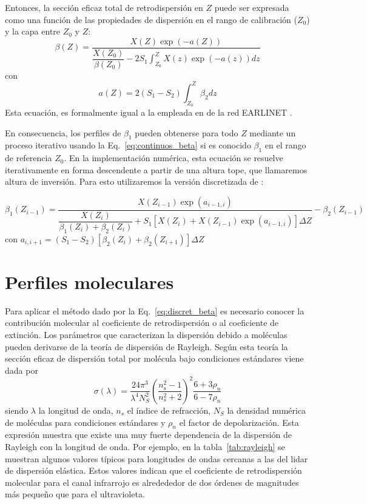 \documentclass[12pt,a4paper,final]{report}
\begin{document}
	Entonces, la sección eficaz total de retrodispersión en $Z$ puede ser expresada como una función de las propiedades de dispersión en el rango de calibración ($Z_0$) y la capa entre $Z_0$ y $Z$:	
	\begin{equation}
	\beta(Z)=\frac{\displaystyle X(Z) \exp(-a(Z))}{\displaystyle \dfrac{X(Z_0)}{\beta(Z_0)}-2S_1 \int_{Z_0}^{Z} X(z)\exp(-a(z))dz}
	\label{eq:continuos_beta}
	\end{equation}
	con 
	\[ a(Z)=2(S_1-S_2)\int_{Z_0}^{Z} \beta_2 dz \]
	Esta ecuación, es formalmente igual a la empleada en de la red EARLINET \citep{bockmann2004}.
	
	En consecuencia, los perfiles de $\beta_1$ pueden obtenerse para todo $Z$ mediante un proceso iterativo  usando la Eq.~\ref{eq:continuos_beta} si es conocido $\beta_1$ en el rango de referencia $Z_0$. En la implementación numérica, esta ecuación se resuelve iterativamente en forma descendente a partir de una altura tope, que llamaremos altura de inversión. Para esto utilizaremos la versión discretizada de \citet{fernald1984}:
	
	\begin{equation}
	\beta_1(Z_{i-1}) = \dfrac
	{X(Z_{i-1}) \exp(a_{i-1,i})}
	{\dfrac{X(Z_{i})}{\beta_1(Z_{i})+\beta_2(Z_{i})}
		+S_1[X(Z_{i})+X(Z_{i-1}) \exp(a_{i-1,i})]\Delta Z}
	-\beta_2(Z_{i-1})
	\label{eq:discret_beta}
	\end{equation}
	con $a_{i,i+1}=(S_1-S_2)[\beta_2(Z_i)+\beta_2(Z_{i+1})]\Delta Z$
	
	\section{Perfiles moleculares}
	Para aplicar el método dado por la Eq.~\ref{eq:discret_beta} es necesario conocer la contribución molecular al coeficiente de retrodispersión o al coeficiente de extinción. Los parámetros que caracterizan la dispersión debido a moléculas pueden derivarse de la teoría de dispersión de Rayleigh. Según esta teoría la sección eficaz de dispersión total por molécula bajo condiciones estándares viene dada por \citep{bucholtz1995}
	\begin{equation}
	\sigma(\lambda) = 
	\dfrac{24 \pi^3}{\lambda^4 N_S^2} 
	\left( \dfrac{n_s^2-1}{n_s^2+2} \right)^2
	\dfrac{6+3 \rho_n}{6-7 \rho_n}
	\end{equation}
	siendo $\lambda$ la longitud de onda, $n_s$ el índice de refracción, $N_S$ la densidad numérica de moléculas para condiciones estándares y $\rho_n$ el factor de depolarización. Esta expresión muestra que existe una muy fuerte dependencia de la dispersión de Rayleigh con la longitud de onda. Por ejemplo, en la tabla~\ref{tab:rayleigh} se muestran algunos valores típicos para longitudes de ondas cercanas a las del lidar de dispersión elástica. Estos valores indican que el coeficiente de retrodispersión molecular para el canal infrarrojo es alredededor de dos órdenes de magnitudes más pequeño que para el ultravioleta.
\end{document}
